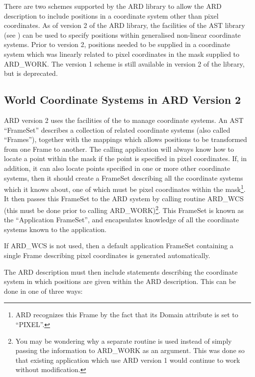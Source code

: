 There are two schemes supported by the ARD library to allow the ARD 
description to include positions in a coordinate system other than pixel 
coordinates. As of version 2 of the ARD library, the facilities of the
AST library (see ) can be used to specify
positions within generalised non-linear coordinate systems. Prior to 
version 2, positions needed to be supplied in a coordinate system which
was linearly related to pixel coordinates in the mask supplied to
ARD\_WORK. The version 1 scheme is still available in version 2 of the
library, but is deprecated.

\subsection{World Coordinate Systems in ARD Version 2}

ARD version 2 uses the facilities of the  to
manage coordinate systems. An AST ``FrameSet'' describes a collection of
related coordinate systems (also called ``Frames''), together with the
mappings which allows positions to be transformed from one Frame to
another. The calling application will always know how to locate a point
within the mask if the point is specified in pixel coordinates. If, in
addition, it can also locate points specified in one or more other
coordinate systems, then it should create a FrameSet describing all the
coordinate systems which it knows about, one of which must be pixel
coordinates within the mask\footnote{ARD recognizes this Frame by the
fact that its Domain attribute is set to ``PIXEL''.}. It then passes this
FrameSet to the ARD system by calling routine ARD\_WCS (this must be done
prior to calling ARD\_WORK)\footnote{You may be wondering why a separate
routine is used instead of simply passing the information to ARD\_WORK as
an argument. This was done so that existing application which use ARD
version 1 would continue to work without modification.}. This FrameSet is
known as the ``Application FrameSet'', and encapsulates knowledge of all
the coordinate systems known to the application. 

If ARD\_WCS is not used, then a default application FrameSet containing a
single Frame describing pixel coordinates is generated automatically.

The ARD description must then include statements describing the 
coordinate system in which positions are given within the ARD description. 
This can be done in one of three ways:

